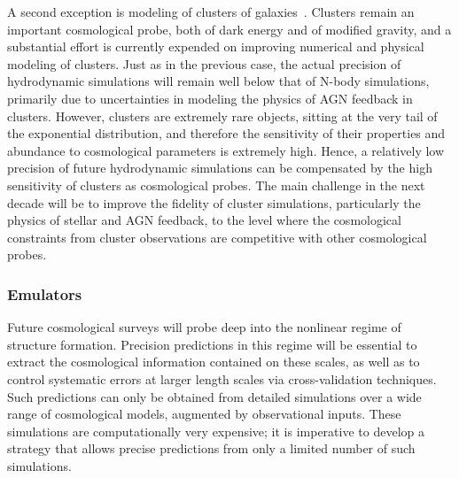 A second exception is modeling of clusters of
galaxies~\cite{clusters}. Clusters remain an important cosmological
probe, both of dark energy and of modified gravity, and a substantial
effort is currently expended on improving numerical and physical
modeling of clusters. Just as in the previous case, the actual
precision of hydrodynamic simulations will remain well below that of
N-body simulations, primarily due to uncertainties in modeling the
physics of AGN feedback in clusters.  However, clusters are extremely
rare objects, sitting at the very tail of the exponential
distribution, and therefore the sensitivity of their properties and
abundance to cosmological parameters is extremely high. Hence, a
relatively low precision of future hydrodynamic simulations can be
compensated by the high sensitivity of clusters as cosmological
probes. The main challenge in the next decade will be to improve the
fidelity of cluster simulations, particularly the physics of stellar
and AGN feedback, to the level where the cosmological constraints from
cluster observations are competitive with other cosmological probes.

\subsubsection{ Emulators}

Future cosmological surveys will probe deep into the nonlinear regime
of structure formation. Precision predictions in this regime will be
essential to extract the cosmological information contained on these
scales, as well as to control systematic errors at larger length
scales via cross-validation techniques. Such predictions can only be
obtained from detailed simulations over a wide range of cosmological
models, augmented by observational inputs. These simulations are
computationally very expensive; it is imperative to develop a strategy
that allows precise predictions from only a limited number of such
simulations.

